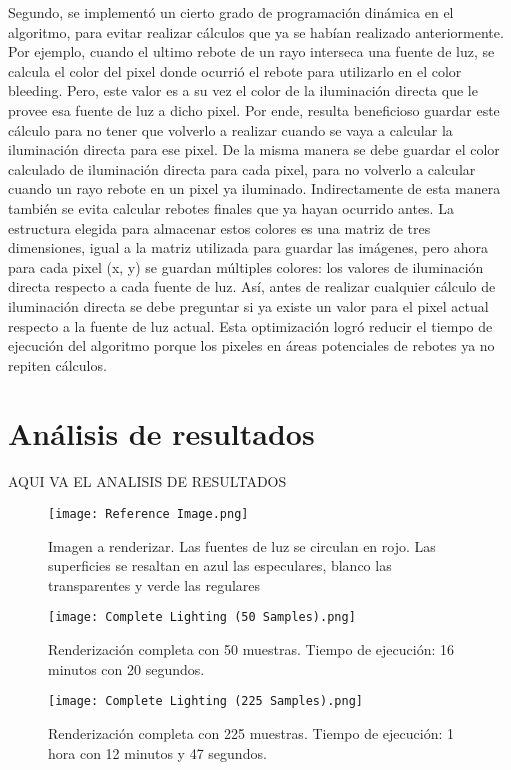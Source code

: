 \documentclass[conference]{IEEEtran}
\begin{document}
Segundo, se implementó un cierto grado de programación dinámica en el algoritmo, para evitar realizar cálculos que ya se habían realizado anteriormente. Por ejemplo, cuando el ultimo rebote de un rayo interseca una fuente de luz, se calcula el color del pixel donde ocurrió el rebote para utilizarlo en el color bleeding. Pero, este valor es a su vez el color de la iluminación directa que le provee esa fuente de luz a dicho pixel. Por ende, resulta beneficioso guardar este cálculo para no tener que volverlo a realizar cuando se vaya a calcular la iluminación directa para ese pixel. De la misma manera se debe guardar el color calculado de iluminación directa para cada pixel, para no volverlo a calcular cuando un rayo rebote en un pixel ya iluminado. Indirectamente de esta manera también se evita calcular rebotes finales que ya hayan ocurrido antes. La estructura elegida para almacenar estos colores es una matriz de tres dimensiones, igual a la matriz utilizada para guardar las imágenes, pero ahora para cada pixel (x, y) se guardan múltiples colores: los valores de iluminación directa respecto a cada fuente de luz. Así, antes de realizar cualquier cálculo de iluminación directa se debe preguntar si ya existe un valor para el pixel actual respecto a la fuente de luz actual. Esta optimización logró reducir el tiempo de ejecución del algoritmo porque los pixeles en áreas potenciales de rebotes ya no repiten cálculos.

\section{Análisis de resultados}

AQUI VA EL ANALISIS DE RESULTADOS

\begin{figure}[htbp]
\centerline{\texttt{[image: Reference Image.png]}}
\caption{Imagen a renderizar. Las fuentes de luz se circulan en rojo. Las superficies se resaltan en azul las especulares, blanco las transparentes y verde las regulares}
\label{Imagen de referencia}
\end{figure}

\begin{figure}[htbp]
\centerline{\texttt{[image: Complete Lighting (50 Samples).png]}}
\caption{Renderización completa con 50 muestras. Tiempo de ejecución: 16 minutos con 20 segundos.}
\label{50 muestras completo}
\end{figure}

\begin{figure}[htbp]
\centerline{\texttt{[image: Complete Lighting (225 Samples).png]}}
\caption{Renderización completa con 225 muestras. Tiempo de ejecución: 1 hora con 12 minutos y 47 segundos.}
\label{225 muestras completo}
\end{figure}
\end{document}
